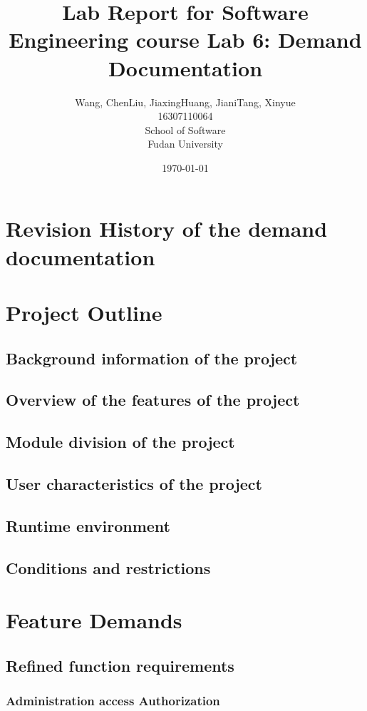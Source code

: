 \documentclass[a4paper]{report}
\title{Lab Report for Software Engineering course \newline
 Lab 6: Demand Documentation}
\author{Wang, Chen\qquad Liu, Jiaxing\qquad Huang, Jiani\qquad Tang, Xinyue \\
16307110064\qquad17302010049\qquad 17302010063\qquad 16307110476 \\
School of Software\\
Fudan University
}
\date{\today}
\begin{document}
\maketitle

\tableofcontents
\chapter{Revision History of the demand documentation}

\chapter{Project Outline}
\section{Background information of the project}

\section{Overview of the features of the project}

\section{Module division of the project}

\section{User characteristics of the project}

\section{Runtime environment}

\section{Conditions and restrictions}

\chapter{Feature Demands}

\section{Refined function requirements}
\subsection{Administration access Authorization}
\end{document}
